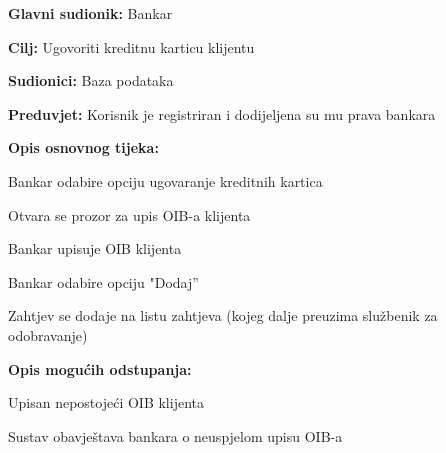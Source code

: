             \noindent {}
            \begin{packed_item}
            
              \item \textbf{Glavni sudionik: }Bankar
              \item  \textbf{Cilj:} Ugovoriti kreditnu karticu klijentu
              \item  \textbf{Sudionici:} Baza podataka
              \item  \textbf{Preduvjet:} Korisnik je registriran i dodijeljena su mu prava bankara
              \item  \textbf{Opis osnovnog tijeka:}
              
              \item[] \begin{packed_enum}
            
                \item Bankar odabire opciju ugovaranje kreditnih kartica
                \item Otvara se prozor za upis OIB-a klijenta
                \item Bankar upisuje OIB klijenta
                \item Bankar odabire  opciju "Dodaj”
                \item Zahtjev se dodaje na listu zahtjeva (kojeg dalje preuzima službenik za odobravanje) 
              \end{packed_enum}
              
              \item  \textbf{Opis mogućih odstupanja:}
              
              \item[] \begin{packed_item}
            
                \item[2.a] Upisan nepostojeći OIB klijenta
                \item[] \begin{packed_enum}
                  
                  \item Sustav obavještava bankara o neuspjelom upisu OIB-a
                  
                \end{packed_enum}
                
              \end{packed_item}
            \end{packed_item}
            
